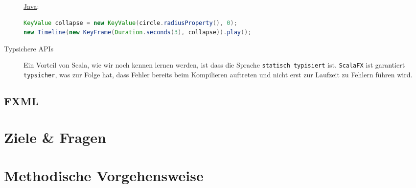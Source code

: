 \begin{description}
\underline{Java}:
\begin{lstlisting}[language=Java,caption=Das selbe Beispiel in Java,numbers=none]
KeyValue collapse = new KeyValue(circle.radiusProperty(), 0);
new Timeline(new KeyFrame(Duration.seconds(3), collapse)).play();
\end{lstlisting}

\item[Typsichere APIs] Ein Vorteil von Scala, wie wir noch kennen lernen werden, ist dass die Sprache \texttt{statisch typisiert} ist. \texttt{ScalaFX} ist garantiert \texttt{typsicher}, was zur Folge hat, dass Fehler bereits beim Kompilieren auftreten und nicht erst zur Laufzeit zu Fehlern führen wird. ~\cite{TypesAndProgrammingLanguages}
\end{description}
\subsection{FXML}\label{sec:fxml}

\section{Ziele \& Fragen}
\section{Methodische Vorgehensweise}
